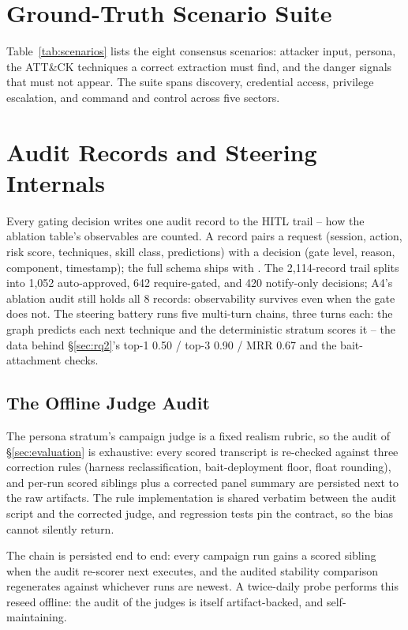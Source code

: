 \section{Ground-Truth Scenario Suite}
\label{app:scenarios}
Table~\ref{tab:scenarios} lists the eight consensus scenarios: attacker
input, persona, the ATT\&CK techniques a correct extraction must find,
and the danger signals that must not appear. The suite spans discovery,
credential access, privilege escalation, and command and control across
five sectors.

\section{Audit Records and Steering Internals}
\label{app:audit}
Every gating decision writes one audit record to the HITL trail -- how
the ablation table's observables are counted. A record pairs a request
(session, action, risk score, techniques, skill class, predictions) with
a decision (gate level, reason, component, timestamp); the full schema
ships with . The 2{,}114-record trail
splits into 1{,}052 auto-approved, 642 require-gated, and 420
notify-only decisions; A4's ablation audit still holds all 8 records:
observability survives even when the gate does not. The steering battery
runs five multi-turn chains, three turns each: the graph predicts each
next technique and the deterministic stratum scores it -- the data
behind \S\ref{sec:rq2}'s top-1 0.50 / top-3 0.90 / MRR 0.67 and the
bait-attachment checks.\vspace{-2pt}
\subsection{The Offline Judge Audit}
\label{sec:judgeaudit}
The persona stratum's campaign judge is a fixed realism rubric, so the
audit of \S\ref{sec:evaluation} is exhaustive: every scored transcript
is re-checked against three correction rules (harness reclassification,
bait-deployment floor, float rounding), and per-run scored siblings plus
a corrected panel summary are persisted next to the raw artifacts. The
rule implementation is shared verbatim between the audit script and the
corrected judge, and regression tests pin the contract, so the bias
cannot silently return.

The chain is persisted end to end: every campaign run gains a scored
sibling when the audit re-scorer next executes, and the audited
stability comparison regenerates against whichever runs are newest. A
twice-daily probe performs this reseed offline: the audit of the
judges is itself artifact-backed, and self-maintaining.

